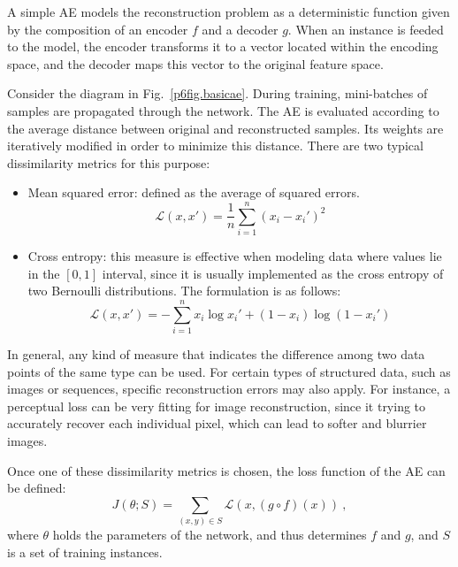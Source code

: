 A simple AE models the reconstruction problem as a deterministic function given by the composition of an encoder $f$ and a decoder $g$. When an instance is feeded to the model, the encoder transforms it to a vector located within the encoding space, and the decoder maps this vector to the original feature space.

Consider the diagram in Fig.~\ref{p6fig.basicae}. During training, mini-batches of samples are propagated through the network. The AE is evaluated according to the average distance between original and reconstructed samples. Its weights are iteratively modified in order to minimize this distance. There are two typical dissimilarity metrics for this purpose:

\begin{itemize}
  \item Mean squared error: defined as the average of squared errors.  \begin{equation}\mathcal L(x,x')=\frac 1 n \sum_{i=1}^n(x_i - x_i')^2\end{equation}
  \item Cross entropy: this measure is effective when modeling data where values lie in the $[0,1]$ interval, since it is usually implemented as the cross entropy of two Bernoulli distributions. The formulation is as follows: \begin{equation}\mathcal L(x,x')= -\sum_{i=1}^n x_i\log x_i'  + (1-x_i)\log(1-x_i') \end{equation}
\end{itemize}

In general, any kind of measure that indicates the difference among two data points of the same type can be used. For certain types of structured data, such as images or sequences, specific reconstruction errors may also apply. For instance, a perceptual loss \cite{johnson2016perceptual} can be very fitting for image reconstruction, since it  trying to accurately recover each individual pixel, which can lead to softer and blurrier images.

Once one of these dissimilarity metrics is chosen, the loss function of the AE can be defined:
\begin{equation}
  J(\theta;S)=\sum_{(x,y)\in S} \mathcal L(x, (g\circ f)(x))~,
\end{equation}
where $\theta$ holds the parameters of the network, and thus determines $f$ and $g$, and $S$ is a set of training instances.

